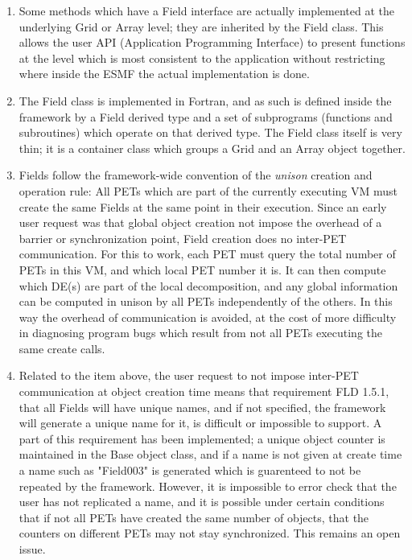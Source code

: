 

\begin{enumerate}

\item Some methods which have a Field interface are actually 
implemented at the underlying Grid or Array level; they
are inherited by the Field class.  This allows the user
API (Application Programming Interface) to present functions at
the level which is most consistent to the application without
restricting where inside the ESMF the actual implementation
is done.

\item The Field class is implemented in Fortran, and as such is
defined inside the framework by a Field derived type and a set of 
subprograms (functions and subroutines) which operate on that derived type.  
The Field class itself is very thin; it is a container class which
groups a Grid and an Array object together.

\item Fields follow the framework-wide convention of the
{\it unison} creation and operation rule: All PETs which are
part of the currently executing VM must create the
same Fields at the same point in their execution.  Since an early
user request was that global object creation not impose the overhead of
a barrier or synchronization point, Field creation does no inter-PET
communication.  For this to work, each PET must query the total number
of PETs in this VM, and which local PET number it is.  It can then
compute which DE(s) are part of the local decomposition, and any
global information can be computed in unison by all PETs independently
of the others.  In this way the overhead of communication is avoided,
at the cost of more difficulty in diagnosing program bugs which result
from not all PETs executing the same create calls.

\item Related to the item above, the user request to not impose
inter-PET communication at object creation time means that requirement
FLD 1.5.1, that all Fields will have unique names, and if not specified, 
the framework will generate a unique name for it, is difficult or
impossible to support.  A part of this requirement has been implemented;
a unique object counter is maintained in the Base object class, and if
a name is not given at create time a name such as "Field003" is generated
which is guarenteed to not be repeated by the framework.   However, it
is impossible to error check that the user has not replicated a name,
and it is possible under certain conditions that if not all PETs have
created the same number of objects, that the counters on different PETs
may not stay synchronized.   This remains an open issue.

\end{enumerate}
